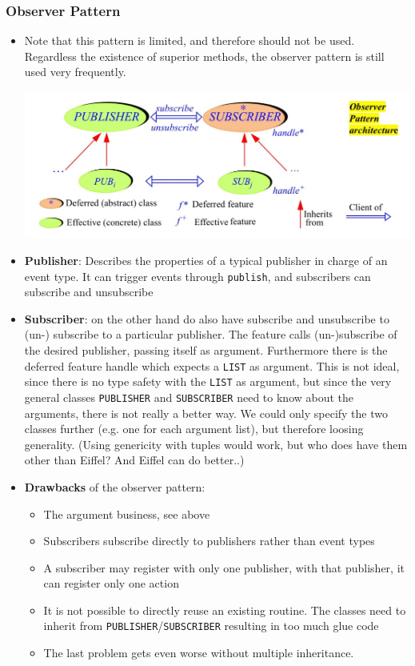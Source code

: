 \documentclass[a4paper]{article}
\newcommand{\inline}[1]{\lstinline!#1!}%
\begin{document}
\subsubsection{Observer Pattern}
\begin{itemize}
\item Note that this pattern is limited, and therefore should not be used. Regardless the existence of superior methods, the observer pattern is still used very frequently.

\begin{center}
\includegraphics[scale=0.26]{Figures/observerPatternArchitecture.jpg}
\end{center}

\item \textbf{Publisher}: Describes the properties of a typical publisher in charge of an event type. It can trigger events through \inline{publish}, and subscribers can subscribe and unsubscribe
\item \textbf{Subscriber}:  on the other hand do also have subscribe and unsubscribe to (un-) subscribe to a 
particular publisher. The feature calls (un-)subscribe of the desired publisher, passing itself as 
argument. Furthermore there is the deferred feature handle which expects a \inline{LIST} as 
argument. This is not ideal, since there is no type safety with the \inline{LIST} as argument, but since 
the very general classes \inline{PUBLISHER} and \inline{SUBSCRIBER} need to know about the arguments, there is not really a better way. We could only specify the two classes further (e.g. one for 
each argument list), but therefore loosing generality. (Using genericity with tuples would 
work, but who does have them other than Eiffel? And Eiffel can do better..)
\item \textbf{Drawbacks} of the observer pattern:
\begin{itemize}
\item The argument business, see above
\item Subscribers subscribe directly to publishers rather than event types
\item A subscriber may register with only one publisher, with that publisher, it can register only one action
\item It is not possible to directly reuse an existing routine. The classes need to inherit from \inline{PUBLISHER}/\inline{SUBSCRIBER} resulting in too much glue code
\item The last problem gets even worse without multiple inheritance. 
\end{itemize}
\end{itemize}
\end{document}

